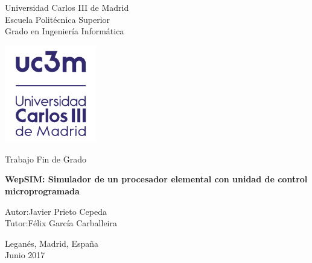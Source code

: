 \documentclass[11pt,twoside]{mitthesis}
\begin{document}

\begin{titlepage}
    \begin{center}
        \vspace*{1cm}
     
        \Large
        Universidad Carlos III de Madrid\\
        Escuela Politécnica Superior\\
        Grado en Ingeniería Informática
        
        \vspace{0.8cm}
        
        \centering        
        \includegraphics[width=0.3\textwidth]{figures/logo-nuevo}
        
        \vspace{1.5cm}
        
        \LARGE
        Trabajo Fin de Grado
        
        \Huge
        \textbf{WepSIM: Simulador de un procesador elemental con unidad de control microprogramada}
        
        \vspace{0.5cm}
        
        \vspace{1.5cm}
        
        \Large
        \begin{changemargin}{3.8cm}{3.8cm}
        Autor:\hfill Javier Prieto Cepeda\\
        Tutor:\hfill Félix García Carballeira\\
        \end{changemargin}
		\begin{changemargin}{3.8cm}{3.8cm}
		\begin{flushright}		        
        \vspace{0.5cm}
        Leganés, Madrid, España\\
        Junio 2017
 		\end{flushright}
        \end{changemargin}
        
        \vfill
        
    \end{center}
\end{titlepage}
\end{document}
